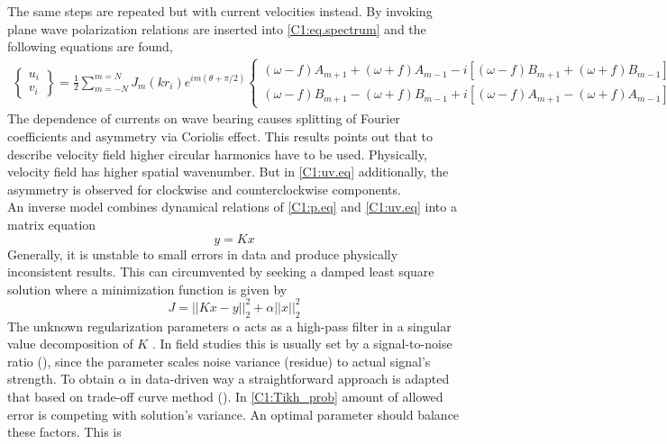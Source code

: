 \documentclass[12pt]{article}
\begin{document}
The same steps are repeated but with current velocities instead. By invoking plane wave  
polarization relations \citep[e.g.,][]{muller2000scattering} are inserted into 
\eqref{C1:eq.spectrum} and the following equations are found,
\begin{align}
\label{C1:uv.eq}
\begin{Bmatrix}
u_i \\ v_i
\end{Bmatrix}
= \frac{1}{2} \sum_{m = -N}^{m = N} J_{m} (kr_i) e^{im(\theta + \pi/2)}
\begin{Bmatrix}
(\omega - f) A_{m + 1} + (\omega + f) A_{m - 1} - i [(\omega - f) B_{m + 1} + (\omega + f) B_{m - 
1}] \\ 
(\omega - f) B_{m + 1} - (\omega + f) B_{m - 1} + i [ (\omega - f) A_{m + 1} - (\omega + f) A_{m - 
1}]
\end{Bmatrix}
\end{align}
The dependence of currents on wave bearing causes splitting of Fourier coefficients and 
asymmetry via Coriolis effect. This results points out that to describe velocity field 
higher circular harmonics have to be used. Physically, velocity field has higher spatial 
wavenumber. But in \eqref{C1:uv.eq} additionally, the asymmetry is observed 
for clockwise and counterclockwise components.\\
An inverse model combines dynamical relations of \eqref{C1:p.eq} and \eqref{C1:uv.eq} into a matrix 
equation
\begin{equation}
y = K x
\end{equation}
Generally, it is unstable to small errors in data and produce physically inconsistent results. This 
can circumvented by seeking a damped least square solution \citep{munk2009ocean} where a 
minimization function is given by
\begin{equation}
\label{C1:Tikh_prob}
J = ||K x - y||^2_2 + \alpha ||x||^2_2
\end{equation}
The unknown regularization parameters $\alpha$ acts as a high-pass filter in a singular value 
decomposition of $K$ \citep{bennett1992inverse}. In field studies this is usually set by a 
signal-to-noise ratio (\cite{munk2009ocean}), since the parameter scales noise variance (residue) 
to actual signal's strength. To obtain $\alpha$ in data-driven way a straightforward approach is 
adapted that based on 
trade-off curve method (\cite{hansen1993use}). In \eqref{C1:Tikh_prob} amount of allowed error 
is competing with solution's variance. An optimal parameter should balance these factors. This is 
\end{document}
